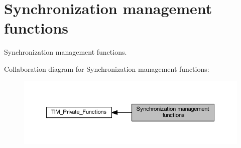 \hypertarget{group___t_i_m___group7}{}\section{Synchronization management functions}
\label{group___t_i_m___group7}


Synchronization management functions.  


Collaboration diagram for Synchronization management functions\+:
\nopagebreak
\begin{figure}[H]
\begin{center}
\leavevmode
\includegraphics[width=350pt]{group___t_i_m___group7}
\end{center}
\end{figure}
